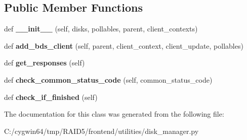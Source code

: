 \subsection*{Public Member Functions}
\begin{DoxyCompactItemize}
\item 
\mbox{\label{class_r_a_i_d5_1_1frontend_1_1utilities_1_1disk__manager_1_1_disk_manager_aebf7e397d66638593416763f24da1b23}} 
def {\bfseries \+\_\+\+\_\+init\+\_\+\+\_\+} (self, disks, pollables, parent, client\+\_\+contexts)
\item 
\mbox{\label{class_r_a_i_d5_1_1frontend_1_1utilities_1_1disk__manager_1_1_disk_manager_a3e1cc950045e74e82c3df387a37a45ae}} 
def {\bfseries add\+\_\+bds\+\_\+client} (self, parent, client\+\_\+context, client\+\_\+update, pollables)
\item 
\mbox{\label{class_r_a_i_d5_1_1frontend_1_1utilities_1_1disk__manager_1_1_disk_manager_a33c98d9dff3816d3f9289ef231fe2f21}} 
def {\bfseries get\+\_\+responses} (self)
\item 
\mbox{\label{class_r_a_i_d5_1_1frontend_1_1utilities_1_1disk__manager_1_1_disk_manager_a4ea9c35624035aab6f333484505044e6}} 
def {\bfseries check\+\_\+common\+\_\+status\+\_\+code} (self, common\+\_\+status\+\_\+code)
\item 
\mbox{\label{class_r_a_i_d5_1_1frontend_1_1utilities_1_1disk__manager_1_1_disk_manager_a442742d8aa207953583ece1144af1db0}} 
def {\bfseries check\+\_\+if\+\_\+finished} (self)
\end{DoxyCompactItemize}


The documentation for this class was generated from the following file\+:\begin{DoxyCompactItemize}
\item 
C\+:/cygwin64/tmp/\+R\+A\+I\+D5/frontend/utilities/disk\+\_\+manager.\+py\end{DoxyCompactItemize}
